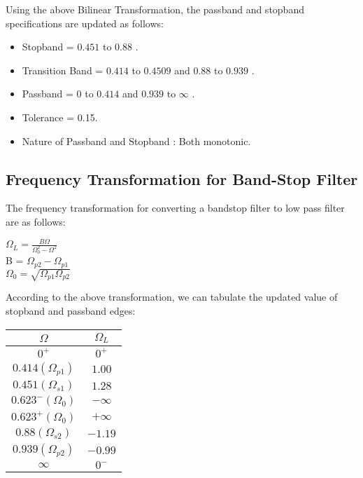 \documentclass{article}
\begin{document}
Using the above Bilinear Transformation, the passband and stopband specifications are updated as follows:\\

\begin{itemize}
    \item Stopband = $0.451$ to $0.88$ .
    \item Transition Band = $0.414$ to $0.4509$ and $0.88$ to $0.939$ .
    \item Passband = $0$ to $0.414$  and $0.939$ to $\infty$ .
    \item Tolerance = 0.15.
    \item Nature of Passband and Stopband : Both monotonic.
\end{itemize}

\subsection{Frequency Transformation for Band-Stop Filter}
The frequency transformation for converting a bandstop filter to low pass filter are as follows:\\

\begin{center}
    $\Omega _{L} = \frac{B\Omega}{\Omega _{0}^{2} - \Omega^{2}}$\\
    B = $\Omega _{p2} - \Omega _{p1}$\\
    $\Omega _{0} = \sqrt{\Omega _{p1}\Omega _{p2}}$ \\
\end{center}

According to the above transformation, we can tabulate the updated value of stopband and passband edges:\\

\begin{table}[h]
    \centering
    \begin{tabular}{|c|c|}
        \hline
       $\Omega$ & $\Omega _{L}$\\
       \hline
       $0^+$  & $0^+$   \\
       \hline
       $0.414 (\Omega_{p1})$  & $1.00$   \\
       \hline
        $0.451 (\Omega_{s1})$  & $1.28$   \\
       \hline
       $0.623^- (\Omega_{0})$  & $-\infty$   \\
       \hline
       $0.623^+ (\Omega_{0})$  & $+\infty$   \\
       \hline
       $0.88 (\Omega_{s2})$  & $-1.19$   \\
       \hline
       $0.939 (\Omega_{p2})$  & $-0.99$   \\
       \hline
       $\infty$  & $0^-$   \\
       \hline
    \end{tabular}
\end{table}
\end{document}
